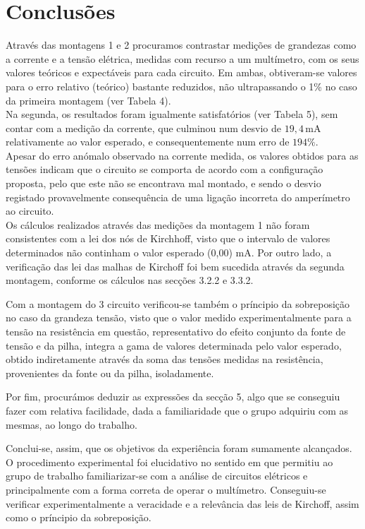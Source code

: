 \section{Conclusões}

Através das montagens 1 e 2 procuramos contrastar medições de grandezas como a corrente e a tensão elétrica, medidas com recurso a um multímetro, com os seus valores teóricos e expectáveis para cada circuito. Em ambas, obtiveram-se valores para o erro relativo (teórico) bastante reduzidos, não ultrapassando o 1\% no caso da primeira montagem (ver Tabela 4).
\\Na segunda, os resultados foram igualmente satisfatórios (ver Tabela 5), sem contar com a medição da corrente, que culminou num desvio de $19,4\,\text{mA}$ relativamente ao valor esperado, e consequentemente num erro de $194\%$.
\\Apesar do erro anómalo observado na corrente medida, os valores obtidos para as tensões indicam que o circuito se comporta de acordo com a configuração proposta, pelo que este não se encontrava mal montado, e sendo o desvio registado provavelmente consequência de uma ligação incorreta do amperímetro ao circuito.\\

Os cálculos realizados através das medições da montagem 1 não foram consistentes com a lei dos nós de Kirchhoff, visto que o intervalo de valores determinados não continham o valor esperado (0,00) mA. Por outro lado, a verificação das lei das malhas de Kirchoff foi bem sucedida através da segunda montagem, conforme os cálculos nas secções 3.2.2 e 3.3.2.

\bigskip
Com a montagem do 3 circuito verificou-se também o príncipio da sobreposição no caso da grandeza tensão, visto que o valor medido experimentalmente para a tensão na resistência em questão, representativo do efeito conjunto da fonte de tensão e da pilha, integra a gama de valores determinada pelo valor esperado, obtido indiretamente através da soma das tensões medidas na resistência, provenientes da fonte ou da pilha, isoladamente.

\bigskip
Por fim, procurámos deduzir as expressões da secção 5, algo que se conseguiu fazer com relativa facilidade, dada a familiaridade que o grupo adquiriu com as mesmas, ao longo do trabalho.

\bigskip

Conclui-se, assim, que os objetivos da experiência foram sumamente alcançados. O procedimento experimental foi elucidativo no sentido em que permitiu ao grupo de trabalho familiarizar-se com a análise de circuitos elétricos e principalmente com a forma correta de operar o multímetro. Conseguiu-se verificar experimentalmente a veracidade e a relevância das leis de Kirchoff, assim como o príncipio da sobreposição. 